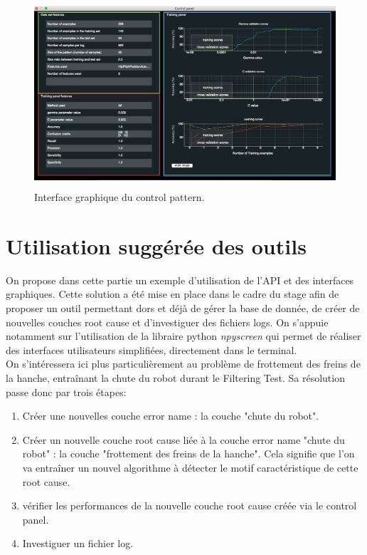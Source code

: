 \begin{figure}[h]
	\centering\includegraphics[height=7cm]{images/control_panel.png}
	\caption[Interface graphique du control pattern]{Interface graphique du control pattern.}
	\label{fig:Interface graphique du control pattern}
\end{figure}

\section{Utilisation suggérée des outils}
\label{Industrialisation du produit: Utilisation suggérée des outils}
On propose dans cette partie un exemple d'utilisation de l'API et des interfaces graphiques. Cette solution a été mise en place dans le cadre du stage afin de proposer un outil permettant dors et déjà de gérer la base de donnée, de créer de nouvelles couches root cause et d'investiguer des fichiers logs. On s'appuie notamment sur l'utilisation de la libraire python \emph{npyscreen} \cite{Npyscreen} qui permet de réaliser des interfaces utilisateurs simplifiées, directement dans le terminal. \\
On s'intéressera ici plus particulièrement au problème de frottement des freins de la hanche, entraînant la chute du robot durant le Filtering Test. Sa résolution passe donc par trois étapes: 
\begin{enumerate}
	\item Créer une nouvelles couche error name : la couche "chute du robot". 
	\item Créer un nouvelle couche root cause liée à la couche error name "chute du robot" : la couche "frottement des freins de la hanche". Cela signifie que l'on va entraîner un nouvel algorithme à détecter le motif caractéristique de cette root cause. 
	\item vérifier les performances de la nouvelle couche root cause créée via le control panel.
	\item Investiguer un fichier log. 
\end{enumerate}

